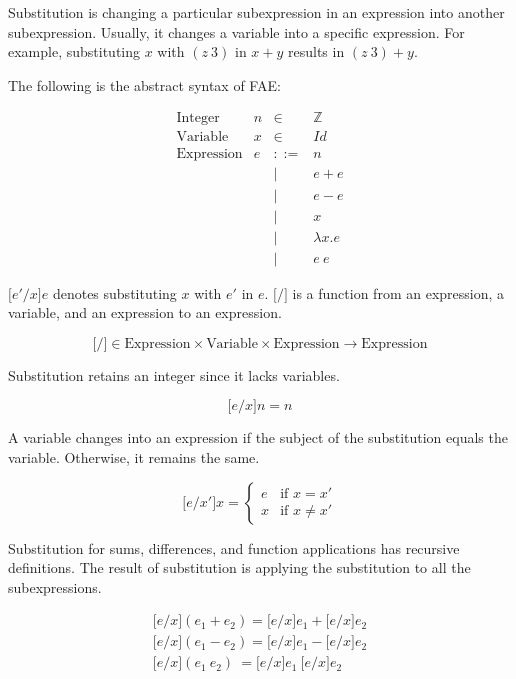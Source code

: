 Substitution is changing a particular subexpression in an expression into another
subexpression. Usually, it changes a variable into a specific expression. For
example, substituting \(x\) with \((z\ 3)\) in \(x+y\) results in \((z\ 3)+y\).

The following is the abstract syntax of FAE:

\[
\begin{array}{lrcl}
\text{Integer} & n & \in & \mathbb{Z} \\
\text{Variable} & x & \in & \textit{Id} \\
\text{Expression} & e & ::= & n \\
&& | & e + e \\
&& | & e - e \\
&& | & x \\
&& | & \lambda x.e \\
&& | & e\ e
\end{array}
\]

\(\lbrack e'/x\rbrack e\) denotes substituting \(x\) with \(e'\) in \(e\).
\(\lbrack /\rbrack\) is a function from an expression, a variable, and an
expression to an expression.

\[
\lbrack/\rbrack \in
\text{Expression}\times\text{Variable}\times\text{Expression}\rightarrow\text{Expression}
\]

Substitution retains an integer since it lacks variables.

\[\lbrack e/x \rbrack n  =  n\]

A variable changes into an expression if the subject of the substitution equals
the variable. Otherwise, it remains the same.

\[
\lbrack e/x' \rbrack x = \begin{cases} e& \text{if } x=x'\\ x & \text{if }
x\not=x'\end{cases}
\]

Substitution for sums, differences, and function applications has recursive
definitions. The result of substitution is applying the substitution to all the
subexpressions.

\[
\begin{array}{rcl}
\lbrack e/x \rbrack (e_1+e_2) = \lbrack e/x \rbrack e_1+\lbrack e/x \rbrack e_2
\\
\lbrack e/x \rbrack (e_1-e_2) = \lbrack e/x \rbrack e_1-\lbrack e/x \rbrack e_2
\\
\lbrack e/x \rbrack (e_1\ e_2)\ = \lbrack e/x \rbrack e_1\ \lbrack e/x \rbrack
e_2
\end{array}
\]

